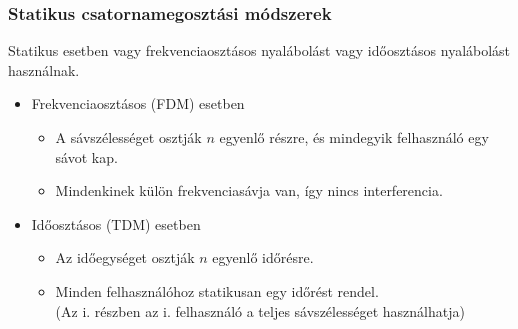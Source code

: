 \documentclass[12pt]{article}
\begin{document}
    \subsubsection*{Statikus csatornamegosztási módszerek}

    \noindent Statikus esetben vagy frekvenciaosztásos nyalábolást vagy időosztásos nyalábolást használnak.
    \begin{itemize}[leftmargin=7.5mm]
        \renewcommand{\labelitemi}{$\vcenter{\hbox{\tiny$\bullet$}}$}
        \item Frekvenciaosztásos (FDM) esetben
        \begin{itemize}[leftmargin=7.5mm]
            \renewcommand{\labelitemii}{$\vcenter{\hbox{\tiny$\circ$}}$}
            \item A sávszélességet osztják $n$ egyenlő részre, és mindegyik felhasználó egy sávot kap.
            \item Mindenkinek külön frekvenciasávja van, így nincs interferencia.
        \end{itemize}
        \item Időosztásos (TDM) esetben
        \begin{itemize}[leftmargin=7.5mm]
            \renewcommand{\labelitemii}{$\vcenter{\hbox{\tiny$\circ$}}$}
            \item Az időegységet osztják $n$ egyenlő időrésre.
            \item Minden felhasználóhoz statikusan egy időrést rendel.\\
            (Az i. részben az i. felhasználó a teljes sávszélességet használhatja)
        \end{itemize}
    \end{itemize}
\end{document}
